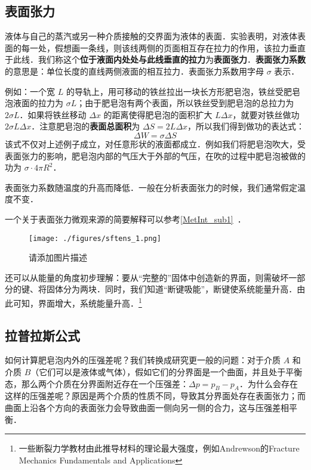 

\subsection{表面张力}

液体与自己的蒸汽或另一种介质接触的交界面为液体的表面．实验表明，对液体表面的每一处，假想画一条线，则该线两侧的页面相互存在拉力的作用，该拉力垂直于此线．我们称这个\textbf{位于液面内处处与此线垂直的拉力}为\textbf{表面张力}．\textbf{表面张力系数} 的意思是：单位长度的直线两侧液面的相互拉力．表面张力系数用字母 $\sigma$ 表示．

例如：一个宽 $L$ 的导轨上，用可移动的铁丝拉出一块长方形肥皂泡，铁丝受肥皂泡液面的拉力为 $\sigma L$；由于肥皂泡有两个表面，所以铁丝受到肥皂泡的总拉力为 $2\sigma L$．如果将铁丝移动 $\Delta x$ 的距离使得肥皂泡的面积扩大 $L\Delta x$，就要对铁丝做功 $2\sigma L\Delta x$．注意肥皂泡的\textbf{表面总面积}为 $\Delta S=2 L \Delta x$，所以我们得到做功的表达式：
\begin{equation}
\Delta W=\sigma \Delta S
\end{equation}
该式不仅对上述例子成立，对任意形状的液面都成立．例如我们将肥皂泡吹大，受表面张力的影响，肥皂泡内部的气压大于外部的气压，在吹的过程中肥皂泡被做的功为 $\sigma\cdot 4\pi R^2$．

表面张力系数随温度的升高而降低．一般在分析表面张力的时候，我们通常假定温度不变．

一个关于表面张力微观来源的简要解释可以参考\autoref{MetInt_sub1}~．

\begin{figure}[ht]
\centering
\texttt{[image: ./figures/sftens\_1.png]}
\caption{请添加图片描述} \label{sftens_fig1}
\end{figure}

还可以从能量的角度初步理解：要从“完整的”固体中创造新的界面，则需破坏一部分的键、将固体分为两块．同时，我们知道“断键吸能”，断键使系统能量升高．由此可知，界面增大，系统能量升高．\footnote{一些断裂力学教材由此推导材料的理论最大强度，例如Andrewson的Fracture Mechanics Fundamentals and Applications}

\subsection{拉普拉斯公式}
如何计算肥皂泡内外的压强差呢？我们转换成研究更一般的问题：对于介质 $A$ 和介质 $B$（它们可以是液体或气体），假如它们的分界面是一个曲面，并且处于平衡态，那么两个介质在分界面附近存在一个压强差：$\Delta p=p_B-p_A$．为什么会存在这样的压强差呢？原因是两个介质的性质不同，导致其分界面处存在表面张力；而曲面上沿各个方向的表面张力会导致曲面一侧向另一侧的合力，这与压强差相平衡．


